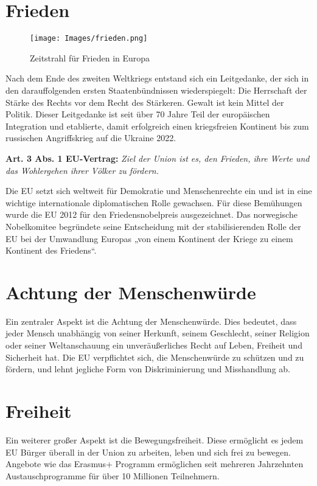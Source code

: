 \documentclass[12pt, oneside]{book} %
\begin{document}
\section{Frieden}
\begin{wrapfigure}{r}{0.5\textwidth} 
    \centering
    \texttt{[image: Images/frieden.png]} 
    \caption{Zeitstrahl für Frieden in Europa}
    \label{fig:wrap}
\end{wrapfigure}
Nach dem Ende des zweiten Weltkriegs entstand sich ein Leitgedanke, der sich in den darauffolgenden ersten Staatenbündnissen wiederspiegelt: Die Herrschaft der Stärke des Rechts vor dem Recht des Stärkeren. Gewalt ist kein Mittel der Politik. Dieser Leitgedanke ist seit über 70 Jahre Teil der europäischen Integration und etablierte, damit erfolgreich einen kriegsfreien Kontinent bis zum russischen Angriffskrieg auf die Ukraine 2022. 

\textbf{Art. 3 Abs. 1 EU-Vertrag:}
\newline
\textit{Ziel der Union ist es, den Frieden, ihre Werte und das Wohlergehen ihrer Völker zu fördern.}

Die EU setzt sich weltweit für Demokratie und Menschenrechte ein und ist in eine wichtige internationale diplomatischen Rolle gewachsen. Für diese Bemühungen wurde die EU 2012 für den Friedensnobelpreis ausgezeichnet. Das norwegische Nobelkomitee begründete seine Entscheidung mit der stabilisierenden Rolle der EU bei der Umwandlung Europas „von einem Kontinent der Kriege zu einem Kontinent des Friedens“. 



\section{Achtung der Menschenwürde}
Ein zentraler Aspekt ist die Achtung der Menschenwürde. Dies bedeutet, dass jeder Mensch unabhängig von seiner Herkunft, seinem Geschlecht, seiner Religion oder seiner Weltanschauung ein unveräußerliches Recht auf Leben, Freiheit und Sicherheit hat. Die EU verpflichtet sich, die Menschenwürde zu schützen und zu fördern, und lehnt jegliche Form von Diskriminierung und Misshandlung ab.

\section{Freiheit}
Ein weiterer großer Aspekt ist die Bewegungsfreiheit. Diese ermöglicht es jedem EU Bürger überall in der Union zu arbeiten, leben und sich frei zu bewegen. Angebote wie das Erasmus+ Programm ermöglichen seit mehreren Jahrzehnten Austauschprogramme für über 10 Millionen Teilnehmern.
\end{document}
